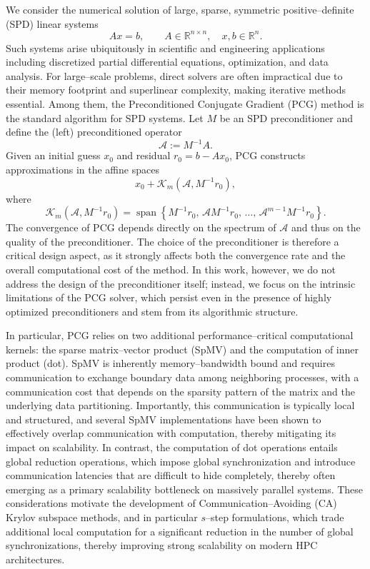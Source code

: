 \documentclass[pdflatex,sn-mathphys-num]{sn-jnl}%
\begin{document}
We consider the numerical solution of large, sparse, symmetric
positive--definite (SPD) linear systems
\[
    Ax = b,
    \qquad A \in \mathbb{R}^{n\times n},
    \quad x, b \in \mathbb{R}^n.
\]
Such systems arise ubiquitously in scientific and engineering applications
including discretized partial differential equations, optimization, and
data analysis.
For large--scale problems, direct solvers are often impractical due to
their memory footprint and superlinear complexity, making iterative
methods essential.
Among them, the Preconditioned Conjugate Gradient (PCG) method is the
standard algorithm for SPD systems.
Let $M$ be an SPD preconditioner and define the (left) preconditioned operator
\[
\mathcal{A} := M^{-1}A.
\]
Given an initial guess $x_0$ and residual $r_0 = b - Ax_0$, PCG constructs approximations in the affine spaces
\[
x_0+\mathcal{K}_m(\mathcal{A},M^{-1}r_0),
\]
where
\[
\mathcal{K}_m(\mathcal{A},M^{-1}r_0)
=
\operatorname{span}
\left\{
M^{-1}r_0,\,
\mathcal{A}M^{-1}r_0,\,
\dots,\,
\mathcal{A}^{m-1}M^{-1}r_0
\right\}.
\]
The convergence of PCG depends directly on the spectrum of $\mathcal{A}$ and thus on the quality of the preconditioner.
The choice of the preconditioner is therefore a critical design aspect, as it strongly affects both the convergence rate and the overall computational cost of the method.
In this work, however, we do not address the design of the preconditioner itself; instead, we focus on the intrinsic limitations of the PCG solver, which persist even in the presence of highly optimized preconditioners and stem from its algorithmic structure.

In particular, PCG relies on two additional performance--critical computational kernels: the sparse matrix--vector product (SpMV) and the computation of inner product (dot).
SpMV is inherently memory--bandwidth bound and requires communication to exchange boundary data among neighboring processes, with a communication cost that depends on the sparsity pattern of the matrix and the underlying data partitioning.
Importantly, this communication is typically local and structured, and several SpMV implementations have been shown to effectively overlap communication with computation, thereby mitigating its impact on scalability.
In contrast, the computation of dot operations entails global reduction operations, which impose global synchronization and introduce communication
latencies that are difficult to hide completely, thereby often
emerging as a primary scalability bottleneck on massively parallel
systems.
These considerations motivate the development of Communication--Avoiding (CA) Krylov subspace methods, and in particular $s$--step formulations, which trade additional local computation for a significant reduction in the number of global synchronizations, thereby improving strong scalability on modern HPC architectures.
\end{document}
